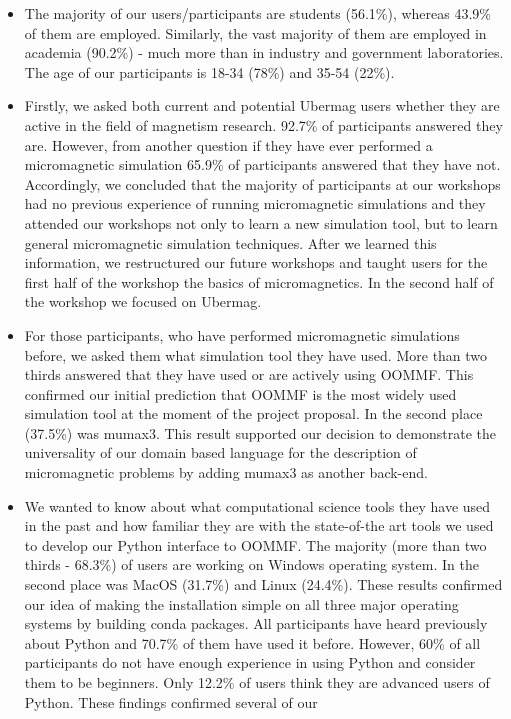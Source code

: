 \documentclass{deliverablereport}
\begin{document}
\begin{itemize}
  \item The majority of our users/participants are students (56.1\%),
whereas 43.9\% of them are employed. Similarly, the vast majority of
them are employed in academia (90.2\%) - much more than in industry
and government laboratories. The age of our participants is 18-34 (78\%) and
35-54 (22\%).
\item Firstly, we asked both current and potential Ubermag users
whether they are active in the field of magnetism research. 92.7\% of
participants answered they are. However, from another question if they
have ever performed a micromagnetic simulation 65.9\% of participants
answered that they have not. Accordingly, we concluded that the
majority of participants at our workshops had no previous experience
of running micromagnetic simulations and they attended our workshops
not only to learn a new simulation tool, but to learn general
micromagnetic simulation techniques. After we learned this
information, we restructured our future workshops and taught users for
the first half of the workshop the basics of micromagnetics. In the
second half of the workshop we focused on Ubermag.
\item For those participants, who have performed micromagnetic
simulations before, we asked them what simulation tool they have
used. More than two thirds answered that they have used or are
actively using OOMMF. This confirmed our initial prediction that OOMMF
is the most widely used simulation tool at the moment of the project
proposal. In the second place (37.5\%) was mumax3. This result
supported our decision to demonstrate the universality of our domain
based language for the description of micromagnetic problems by adding
mumax3 as another back-end.
\item We wanted to know about what computational science tools they
have used in the past and how familiar they are with the state-of-the
art tools we used to develop our Python interface to OOMMF. The
majority (more than two thirds - 68.3\%) of users are working on
Windows operating system. In the second place was MacOS (31.7\%) and
Linux (24.4\%). These results confirmed our idea of making the
installation simple on all three major operating systems by building
conda packages. All participants have heard previously about Python
and 70.7\% of them have used it before. However, 60\% of all
participants do not have enough experience in using Python and
consider them to be beginners. Only 12.2\% of users think they are
advanced users of Python. These findings confirmed several of our

\end{itemize}
\end{document}
